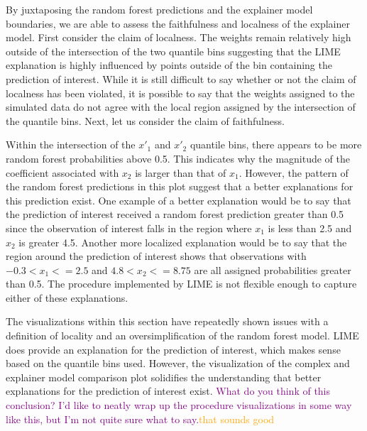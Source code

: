 \documentclass[AMS,STIX2COL]{WileyNJD-v2}\usepackage[]{graphicx}\usepackage[]{color}
\newcommand{\hh}[1]{\textcolor{orange}{#1}}
\newcommand{\kgc}[1]{\textcolor{purple}{#1}}
\begin{document}
{%
By juxtaposing the random forest predictions and the explainer model boundaries, we are able to assess the faithfulness and localness of the explainer model. First consider the claim of localness. The weights remain relatively high  outside of the intersection of the two quantile bins suggesting that the LIME explanation is highly influenced by points outside of the bin containing the prediction of interest. While it is still difficult to say whether or not the claim of localness has been violated, it is possible to say that the weights assigned to the simulated data do not agree with the local region assigned by the intersection of the quantile bins. Next, let us consider the claim of faithfulness. 

Within the intersection of the $x'_1$ and $x'_2$ quantile bins, there appears to be more random forest probabilities above 0.5. This indicates why the magnitude of the coefficient associated with $x_2$ is larger than that of $x_1$. However, the pattern of the random forest predictions in this plot suggest that a better explanations for this prediction exist. One example of a better explanation would be to say that the prediction of interest received a random forest prediction greater than 0.5 since the observation of interest falls in the region where $x_1$ is less than 2.5 and $x_2$ is greater 4.5. Another more localized explanation would be to say that  the region around the prediction of interest shows that observations with $-0.3 < x_1 <= 2.5$ and $4.8 < x_2 <= 8.75$ are all assigned probabilities greater than 0.5. The procedure implemented by LIME is not flexible enough to capture either of these explanations. %

The visualizations within this section have repeatedly shown issues with a definition of locality and an oversimplification of the random forest model. LIME does provide an explanation for the prediction of interest, which makes sense based on the quantile bins used. However, the visualization of the complex and explainer model comparison plot solidifies the understanding that better explanations for the prediction of interest exist. \kgc{What do you think of this conclusion? I'd like to neatly wrap up the procedure visualizations in some way like this, but I'm not quite sure what to say.}\hh{that sounds good}

}
\end{document}
